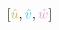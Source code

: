 \documentclass[preview]{standalone}
\begin{document}
$\left[\textcolor[HTML]{d2b057}{\hat{u}}, \textcolor[HTML]{43c8dc}{\hat{v}}, \textcolor[HTML]{dd99d8}{\hat{w}}\right]$
\end{document}
